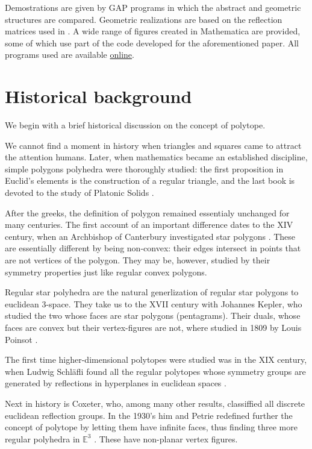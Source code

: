 \documentclass{article}
\theoremstyle{definition}
\newcommand{\E}{\mathbb{E}}
\begin{document}
	Demostrations are given by GAP programs in which the abstract and geometric structures are compared. Geometric realizations are based on the reflection matrices used in \cite{petcox}. A wide range of figures created in Mathematica are provided, some of which use part of the code developed for the aforementioned paper. All programs used are available \href{https://github.com/danimalabares/tesina.git}{online}.
	
	\section{Historical background}
	We begin with a brief historical discussion on the concept of polytope.
	
	We cannot find a moment in history when triangles and squares came to attract the attention humans. Later, when mathematics became an established discipline, simple polygons polyhedra were thoroughly studied: the first proposition in Euclid's elements is the construction of a regular triangle, and the last book is devoted to the study of Platonic Solids \cite{euclid}.
	
	After the greeks, the definition of polygon remained essentialy unchanged for many centuries. The first account of an important difference dates to the XIV century, when an Archbishop of Canterbury investigated star polygons \cite{abstract-polytopes}.
	These are essentially different by being non-convex: their edges intersect in points that are not vertices of the polygon. They may be, however, studied by their symmetry properties just like regular convex polygons.
	
	Regular star polyhedra are the natural generlization of regular star polygons to euclidean 3-space. They take us to the XVII century with Johannes Kepler, who studied the two whose faces are star polygons (pentagrams). Their duals, whose faces are convex but their vertex-figures are not, where studied in 1809 by Louis Poinsot \cite{abstract-polytopes}.
	
	The first time higher-dimensional polytopes were studied was in the XIX century, when Ludwig Schläfli found all the regular polytopes whose symmetry groups are generated by reflections in hyperplanes in euclidean spaces \cite{abstract-polytopes}.
	
	Next in history is Coxeter, who, among many other results, classiffied all discrete euclidean reflection groups. In the 1930's him and Petrie redefined further the concept of polytope by letting them have infinite faces, thus finding three more regular polyhedra in $\E^3$ \cite{regular-skew}. These have non-planar vertex figures.
	
\end{document}
